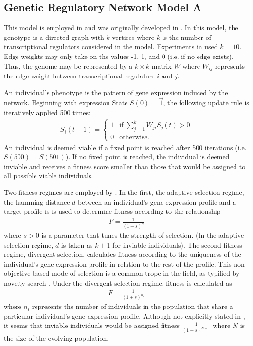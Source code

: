 \subsection{Genetic Regulatory Network Model A} \label{sec:simple_grn}

This model is employed in \cite{Wilder2015ReconcilingEvolvability} and was originally developed in \cite{Draghi2009TheModel}. In this model, the genotype is a directed graph with $k$ vertices where $k$ is the number of transcriptional regulators considered in the model. Experiments in \cite{Wilder2015ReconcilingEvolvability} used $k = 10$. Edge weights may only take on the values -1, 1, and 0 (i.e. if no edge exists). Thus, the genome may be represented by a $k \times k$ matrix $W$ where $W_{ij}$ represents the edge weight between transcriptional regulators $i$ and $j$.

An individual's phenotype is the pattern of gene expression induced by the network. Beginning with expression State $S(0) = \vec{1}$, the following update rule is iteratively applied 500 times:
\begin{align*}
S_i(t+1) = 
\begin{cases}
1 & \text{if } \sum_{j=1}^{k} W_{ji}S_j(t) > 0 \\
0 & \text{otherwise.}
\end{cases}
\end{align*}
An individual is deemed viable if a fixed point is reached after 500 iterations (i.e. $S(500) = S(501)$). If no fixed point is reached, the individual is deemed inviable and receives a fitness score smaller than those that would be assigned to all possible viable individuals. 

Two fitness regimes are employed by \cite{Wilder2015ReconcilingEvolvability}. In the first, the adaptive selection regime, the hamming distance $d$ between an individual's gene expression profile and a target profile is is used to determine fitness according to the relationship
\begin{align*}
F = \frac{1}{(1 + s)^d}
\end{align*}
where $s > 0$ is a parameter that tunes the strength of selection. (In the adaptive selection regime, $d$ is taken as $k + 1$ for inviable individuals). The second fitness regime, divergent selection, calculates fitness according to the uniqueness of the individual's gene expression profile in relation to the rest of the profile. This non-objective-based mode of selection is a common trope in the field, as typified by novelty search \cite{LehmanExploitingNovelty}. Under the divergent selection regime, fitness is calculated as
\begin{align*}
F = \frac{1}{(1 + s)^{n_i}}
\end{align*}
where $n_{i}$ represents the number of individuals in the population that share a particular individual's gene expression profile. Although not explicitly stated in \cite{Wilder2015ReconcilingEvolvability}, it seems that inviable individuals would be assigned fitness $\frac{1}{(1 + s)^{N+1}}$ where $N$ is the size of the evolving population.

